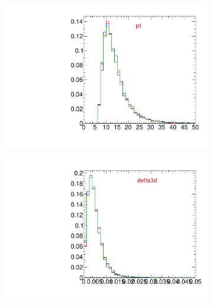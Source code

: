 \begin{figure}
\begin{subfigure}[b]{0.2\textwidth}
                \includegraphics[width=\textwidth]{Figures/VariablesComparison/MC_endcaps_figs_3h/pt}
                \label{fig:MC_endcaps_pt_3h}
        \end{subfigure}
        \begin{subfigure}[b]{0.2\textwidth}
                \centering
                \includegraphics[width=\textwidth]{Figures/VariablesComparison/MC_endcaps_figs_3h/delta3d}
                \label{fig:MC_endcaps_delta3d_3h}
        \end{subfigure}
        \begin{subfigure}[b]{0.2\textwidth}
                \centering

\end{subfigure}
\end{figure}
